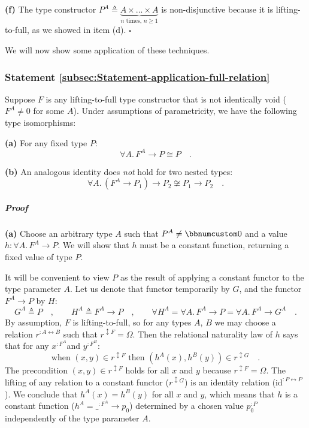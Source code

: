 \textbf{(f)} The type constructor $P^{A}\triangleq\underbrace{A\times...\times A}_{n\text{ times, }n\geq1}$
is non-disjunctive because it is lifting-to-full, as we showed in
item (d). $\square$

We will now show some application of these techniques.

\subsubsection{Statement \label{subsec:Statement-application-full-relation}\ref{subsec:Statement-application-full-relation}}

Suppose $F$ is any lifting-to-full type constructor that is not identically
void ($F^{A}\neq0$ for some $A$). Under assumptions of parametricity,
we have the following type isomorphisms:

\textbf{(a)} For any fixed type $P$:
\[
\forall A.\,F^{A}\rightarrow P\cong P\quad.
\]

\textbf{(b)} An analogous identity does \emph{not} hold for two nested
types:
\[
\forall A.\,(F^{A}\rightarrow P_{1})\rightarrow P_{2}\not\cong P_{1}\rightarrow P_{2}\quad.
\]


\subparagraph{Proof}

\textbf{(a)} Choose an arbitrary type $A$ such that $P^{A}\neq\bbnum 0$
and a value $h:\forall A.\,F^{A}\rightarrow P$. We will show that
$h$ must be a constant function, returning a fixed value of type
$P$.

It will be convenient to view $P$ as the result of applying a constant
functor to the type parameter $A$. Let us denote that functor temporarily
by $G$, and the functor $F^{A}\rightarrow P$ by $H$:
\[
G^{A}\triangleq P\quad,\quad\quad H^{A}\triangleq F^{A}\rightarrow P\quad,\quad\quad\forall H^{A}=\forall A.\,F^{A}\rightarrow P=\forall A.\,F^{A}\rightarrow G^{A}\quad.
\]
By assumption, $F$ is lifting-to-full, so for any types $A$, $B$
we may choose a relation $r^{:A\leftrightarrow B}$ such that $r^{\updownarrow F}=\Omega$.
Then the relational naturality law of $h$ says that for any $x^{:F^{A}}$and
$y^{:F^{B}}$:
\[
\text{when }(x,y)\in r^{\updownarrow F}\text{ then }(h^{A}(x),h^{B}(y))\in r^{\updownarrow G}\quad.
\]
The precondition $(x,y)\in r^{\updownarrow F}$ holds for all $x$
and $y$ because $r^{\updownarrow F}=\Omega$. The lifting of any
relation to a constant functor ($r^{\updownarrow G}$) is an identity
relation ($\text{id}^{:P\leftrightarrow P}$). We conclude that $h^{A}(x)=h^{B}(y)$
for all $x$ and $y$, which means that $h$ is a constant function
($h^{A}=\_^{:F^{A}}\rightarrow p_{0}$) determined by a chosen value
$p_{0}^{:P}$ independently of the type parameter $A$. 

